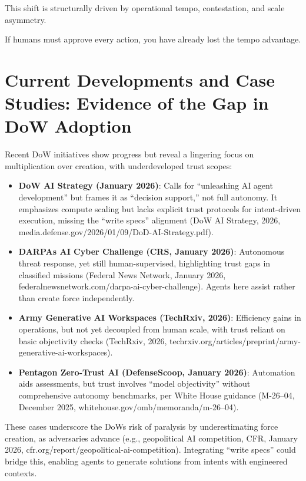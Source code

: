 \documentclass[11pt]{article}
\begin{document}
This shift is structurally driven by operational tempo, contestation, and scale asymmetry.

\begin{calloutquote}
If humans must approve every action, you have already lost the tempo advantage.
\end{calloutquote}

\section{Current Developments and Case Studies: Evidence of the Gap in DoW Adoption}\label{current-developments-and-case-studies-evidence-of-the-gap-in-dod-adoption}

Recent DoW initiatives show progress but reveal a lingering focus on multiplication over creation, with underdeveloped trust scopes:

\begin{itemize}
\item
  \textbf{DoW AI Strategy (January 2026)}: Calls for ``unleashing AI agent development'' but frames it as ``decision support,'' not full autonomy. It emphasizes compute scaling but lacks explicit trust protocols for intent-driven execution, missing the ``write specs'' alignment (DoW AI Strategy, 2026, media.defense.gov/2026/01/09/DoD-AI-Strategy.pdf).
\item
  \textbf{DARPA\textquotesingle s AI Cyber Challenge (CRS, January 2026)}: Autonomous threat response, yet still human-supervised, highlighting trust gaps in classified missions (Federal News Network, January 2026, federalnewsnetwork.com/darpa-ai-cyber-challenge). Agents here assist rather than create force independently.
\item
  \textbf{Army Generative AI Workspaces (TechRxiv, 2026)}: Efficiency gains in operations, but not yet decoupled from human scale, with trust reliant on basic objectivity checks (TechRxiv, 2026, techrxiv.org/articles/preprint/army-generative-ai-workspaces).
\item
  \textbf{Pentagon Zero-Trust AI (DefenseScoop, January 2026)}: Automation aids assessments, but trust involves ``model objectivity'' without comprehensive autonomy benchmarks, per White House guidance (M-26--04, December 2025, whitehouse.gov/omb/memoranda/m-26--04).
\end{itemize}

These cases underscore the DoW\textquotesingle s risk of paralysis by underestimating force creation, as adversaries advance (e.g., geopolitical AI competition, CFR, January 2026, cfr.org/report/geopolitical-ai-competition). Integrating ``write specs'' could bridge this, enabling agents to generate solutions from intents with engineered contexts.
\end{document}
